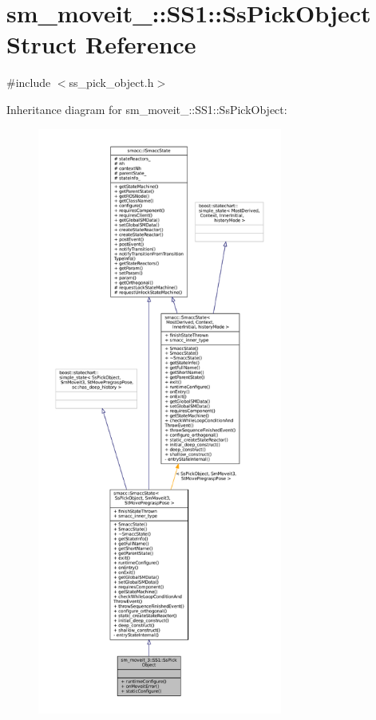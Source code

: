 \hypertarget{structsm__moveit__3_1_1SS1_1_1SsPickObject}{}\section{sm\+\_\+moveit\+\_\+:\+:S\+S1\+:\+:Ss\+Pick\+Object Struct Reference}
\label{structsm__moveit__3_1_1SS1_1_1SsPickObject}


{\ttfamily \#include $<$ss\+\_\+pick\+\_\+object.\+h$>$}



Inheritance diagram for sm\+\_\+moveit\+\_\+:\+:S\+S1\+:\+:Ss\+Pick\+Object\+:
\nopagebreak
\begin{figure}[H]
\begin{center}
\leavevmode
\includegraphics[height=550pt]{structsm__moveit__3_1_1SS1_1_1SsPickObject__inherit__graph}
\end{center}
\end{figure}


